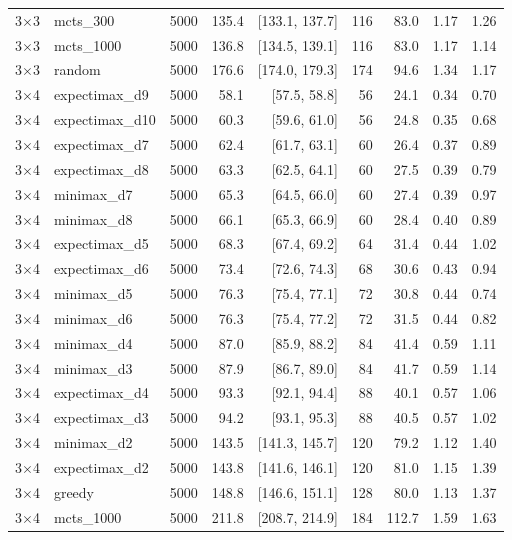 {\begin{longtable}{llrrrrrrr}
3$\times$3 & mcts\_300 & 5000 & 135.4 & [133.1, 137.7] & 116 & 83.0 & 1.17 & 1.26 \\
3$\times$3 & mcts\_1000 & 5000 & 136.8 & [134.5, 139.1] & 116 & 83.0 & 1.17 & 1.14 \\
3$\times$3 & random & 5000 & 176.6 & [174.0, 179.3] & 174 & 94.6 & 1.34 & 1.17 \\
\midrule
3$\times$4 & expectimax\_d9 & 5000 & 58.1 & [57.5, 58.8] & 56 & 24.1 & 0.34 & 0.70 \\
3$\times$4 & expectimax\_d10 & 5000 & 60.3 & [59.6, 61.0] & 56 & 24.8 & 0.35 & 0.68 \\
3$\times$4 & expectimax\_d7 & 5000 & 62.4 & [61.7, 63.1] & 60 & 26.4 & 0.37 & 0.89 \\
3$\times$4 & expectimax\_d8 & 5000 & 63.3 & [62.5, 64.1] & 60 & 27.5 & 0.39 & 0.79 \\
3$\times$4 & minimax\_d7 & 5000 & 65.3 & [64.5, 66.0] & 60 & 27.4 & 0.39 & 0.97 \\
3$\times$4 & minimax\_d8 & 5000 & 66.1 & [65.3, 66.9] & 60 & 28.4 & 0.40 & 0.89 \\
3$\times$4 & expectimax\_d5 & 5000 & 68.3 & [67.4, 69.2] & 64 & 31.4 & 0.44 & 1.02 \\
3$\times$4 & expectimax\_d6 & 5000 & 73.4 & [72.6, 74.3] & 68 & 30.6 & 0.43 & 0.94 \\
3$\times$4 & minimax\_d5 & 5000 & 76.3 & [75.4, 77.1] & 72 & 30.8 & 0.44 & 0.74 \\
3$\times$4 & minimax\_d6 & 5000 & 76.3 & [75.4, 77.2] & 72 & 31.5 & 0.44 & 0.82 \\
3$\times$4 & minimax\_d4 & 5000 & 87.0 & [85.9, 88.2] & 84 & 41.4 & 0.59 & 1.11 \\
3$\times$4 & minimax\_d3 & 5000 & 87.9 & [86.7, 89.0] & 84 & 41.7 & 0.59 & 1.14 \\
3$\times$4 & expectimax\_d4 & 5000 & 93.3 & [92.1, 94.4] & 88 & 40.1 & 0.57 & 1.06 \\
3$\times$4 & expectimax\_d3 & 5000 & 94.2 & [93.1, 95.3] & 88 & 40.5 & 0.57 & 1.02 \\
3$\times$4 & minimax\_d2 & 5000 & 143.5 & [141.3, 145.7] & 120 & 79.2 & 1.12 & 1.40 \\
3$\times$4 & expectimax\_d2 & 5000 & 143.8 & [141.6, 146.1] & 120 & 81.0 & 1.15 & 1.39 \\
3$\times$4 & greedy & 5000 & 148.8 & [146.6, 151.1] & 128 & 80.0 & 1.13 & 1.37 \\
3$\times$4 & mcts\_1000 & 5000 & 211.8 & [208.7, 214.9] & 184 & 112.7 & 1.59 & 1.63 \\

\end{longtable}}
